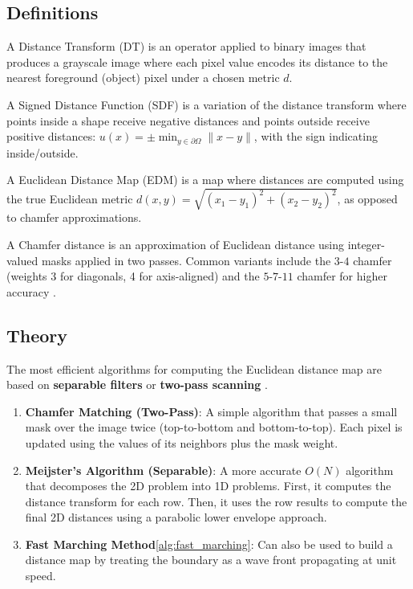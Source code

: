 \subsection{Definitions}
\begin{definition}\label{def:distance_transform}
A Distance Transform (DT) is an operator applied to binary images that produces a grayscale image where each pixel value encodes its distance to the nearest foreground (object) pixel under a chosen metric $d$.
\end{definition}

\begin{definition}\label{def:sdf}
A Signed Distance Function (SDF) is a variation of the distance transform where points inside a shape receive negative distances and points outside receive positive distances: $u(x) = \pm \min_{y \in \partial\Omega} \|x - y\|$, with the sign indicating inside/outside.
\end{definition}

\begin{definition}\label{def:edm}
A Euclidean Distance Map (EDM) is a map where distances are computed using the true Euclidean metric $d(x,y) = \sqrt{(x_1 - y_1)^2 + (x_2 - y_2)^2}$, as opposed to chamfer approximations.
\end{definition}

\begin{definition}\label{def:chamfer}
A Chamfer distance is an approximation of Euclidean distance using integer-valued masks applied in two passes. Common variants include the $3$-$4$ chamfer (weights 3 for diagonals, 4 for axis-aligned) and the $5$-$7$-$11$ chamfer for higher accuracy \cite{rosenfeld1966}.
\end{definition}

\subsection{Theory}
The most efficient algorithms for computing the Euclidean distance map are based on \textbf{separable filters} or \textbf{two-pass scanning} \cite{meijster2002,felzenszwalb2012}.
\begin{enumerate}
  \item \textbf{Chamfer Matching (Two-Pass)}: A simple algorithm that passes a small mask over the image twice (top-to-bottom and bottom-to-top). Each pixel is updated using the values of its neighbors plus the mask weight.
  \item \textbf{Meijster's Algorithm (Separable)}: A more accurate $O(N)$ algorithm that decomposes the 2D problem into 1D problems. First, it computes the distance transform for each row. Then, it uses the row results to compute the final 2D distances using a parabolic lower envelope approach.
  \item \textbf{Fast Marching Method}\cref{alg:fast_marching}: Can also be used to build a distance map by treating the boundary as a wave front propagating at unit speed.
\end{enumerate}

